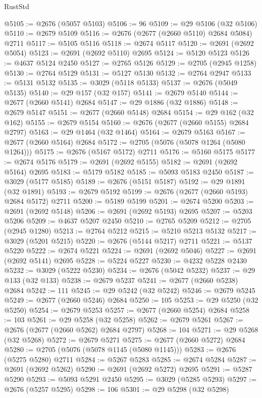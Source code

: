 \begin{lexlean}{RustStd}
\begin{coremodule}
@5105 := @2676 (@5057 @5103)
@5106 := 96
@5109 := @29 @5106 (@32 @5106)
@5110 := @2679 @5109
@5116 := @2676 (@2677 (@2660 @5110) @2684 @5084) @2711
@5117 := @5105 @5116
@5118 := @2674 @5117
@5120 := @2691 (@2692 @5054)
@5123 := @2691 (@2692 @5110) @2695
@5124 := @5120 @5123
@5126 := @4637 @5124 @2450
@5127 := @2765 @5126
@5129 := @2705 (@2945 @1258)
@5130 := @2764 @5129
@5131 := @5127 @5130
@5132 := @2764 @2947
@5133 := @5131 @5132
@5135 := @3029 (@5118 @5133)
@5137 := @2676 (@5049 @5135)
@5140 := @29 @157 (@32 @157)
@5141 := @2679 @5140
@5144 := @2677 (@2660 @5141) @2684
@5147 := @29 @1886 (@32 @1886)
@5148 := @2679 @5147
@5151 := @2677 (@2660 @5148) @2684
@5154 := @29 @162 (@32 @162)
@5155 := @2679 @5154
@5160 := @2676 (@2677 (@2660 @5155) @2684 @2797)
@5163 := @29 @1464 (@32 @1464)
@5164 := @2679 @5163
@5167 := @2677 (@2660 @5164) @2684
@5172 := @2705 (@5076 (@5078 @1264 (@5080 @1264)))
@5175 := @2676 (@5167 @5172) @2711
@5176 := @5160 @5175
@5177 := @2674 @5176
@5179 := @2691 (@2692 @5155)
@5182 := @2691 (@2692 @5164) @2695
@5183 := @5179 @5182
@5185 := @5093 @5183 @2450
@5187 := @3029 (@5177 @5185)
@5189 := @2676 (@5151 @5187)
@5192 := @29 @1891 (@32 @1891)
@5193 := @2679 @5192
@5199 := @2676 (@2677 (@2660 @5193) @2684 @5172) @2711
@5200 := @5189 @5199
@5201 := @2674 @5200
@5203 := @2691 (@2692 @5148)
@5206 := @2691 (@2692 @5193) @2695
@5207 := @5203 @5206
@5209 := @4637 @5207 @2450
@5210 := @2765 @5209
@5212 := @2705 (@2945 @1280)
@5213 := @2764 @5212
@5215 := @5210 @5213 @5132
@5217 := @3029 (@5201 @5215)
@5220 := @2676 (@5144 @5217) @2711
@5221 := @5137 @5220
@5222 := @2674 @5221
@5224 := @2691 (@2692 @5046)
@5227 := @2691 (@2692 @5141) @2695
@5228 := @5224 @5227
@5230 := @4232 @5228 @2430
@5232 := @3029 (@5222 @5230)
@5234 := @2676 (@5042 @5232)
@5237 := @29 @133 (@32 @133)
@5238 := @2679 @5237
@5241 := @2677 (@2660 @5238) @2684
@5242 := 111
@5245 := @29 @5242 (@32 @5242)
@5246 := @2679 @5245
@5249 := @2677 (@2660 @5246) @2684
@5250 := 105
@5253 := @29 @5250 (@32 @5250)
@5254 := @2679 @5253
@5257 := @2677 (@2660 @5254) @2684
@5258 := 103
@5261 := @29 @5258 (@32 @5258)
@5262 := @2679 @5261
@5267 := @2676 (@2677 (@2660 @5262) @2684 @2797)
@5268 := 104
@5271 := @29 @5268 (@32 @5268)
@5272 := @2679 @5271
@5275 := @2677 (@2660 @5272) @2684
@5280 := @2705 (@5076 (@5078 @1145 (@5080 @1145)))
@5283 := @2676 (@5275 @5280) @2711
@5284 := @5267 @5283
@5285 := @2674 @5284
@5287 := @2691 (@2692 @5262)
@5290 := @2691 (@2692 @5272) @2695
@5291 := @5287 @5290
@5293 := @5093 @5291 @2450
@5295 := @3029 (@5285 @5293)
@5297 := @2676 (@5257 @5295)
@5298 := 106
@5301 := @29 @5298 (@32 @5298)

\end{coremodule}
\end{lexlean}
